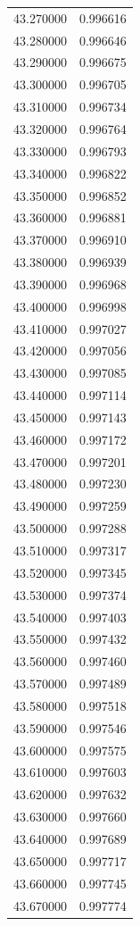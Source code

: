 \begin{tabular}{rr}
43.270000 & 0.996616 \\
43.280000 & 0.996646 \\
43.290000 & 0.996675 \\
43.300000 & 0.996705 \\
43.310000 & 0.996734 \\
43.320000 & 0.996764 \\
43.330000 & 0.996793 \\
43.340000 & 0.996822 \\
43.350000 & 0.996852 \\
43.360000 & 0.996881 \\
43.370000 & 0.996910 \\
43.380000 & 0.996939 \\
43.390000 & 0.996968 \\
43.400000 & 0.996998 \\
43.410000 & 0.997027 \\
43.420000 & 0.997056 \\
43.430000 & 0.997085 \\
43.440000 & 0.997114 \\
43.450000 & 0.997143 \\
43.460000 & 0.997172 \\
43.470000 & 0.997201 \\
43.480000 & 0.997230 \\
43.490000 & 0.997259 \\
43.500000 & 0.997288 \\
43.510000 & 0.997317 \\
43.520000 & 0.997345 \\
43.530000 & 0.997374 \\
43.540000 & 0.997403 \\
43.550000 & 0.997432 \\
43.560000 & 0.997460 \\
43.570000 & 0.997489 \\
43.580000 & 0.997518 \\
43.590000 & 0.997546 \\
43.600000 & 0.997575 \\
43.610000 & 0.997603 \\
43.620000 & 0.997632 \\
43.630000 & 0.997660 \\
43.640000 & 0.997689 \\
43.650000 & 0.997717 \\
43.660000 & 0.997745 \\
43.670000 & 0.997774 \\

\end{tabular}
